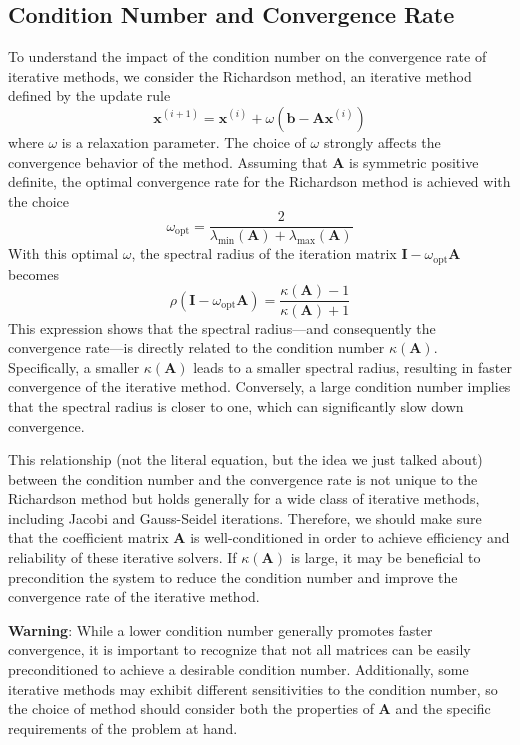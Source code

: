 \subsection{Condition Number and Convergence Rate}
To understand the impact of the condition number on the convergence rate of iterative methods, we consider the Richardson method, an iterative method defined by the update rule
\begin{equation*}
    \mathbf{x}^{(i+1)} = \mathbf{x}^{(i)} + \omega (\mathbf{b} - \mathbf{A}\mathbf{x}^{(i)})
\end{equation*}
where $\omega$ is a relaxation parameter. The choice of $\omega$ strongly affects the convergence behavior of the method. Assuming that $\mathbf{A}$ is symmetric positive definite, the optimal convergence rate for the Richardson method is achieved with the choice
\begin{equation*}
    \omega_{\text{opt}} = \frac{2}{\lambda_{\min}(\mathbf{A}) + \lambda_{\max}(\mathbf{A})}
\end{equation*}
With this optimal $\omega$, the spectral radius of the iteration matrix $\mathbf{I} - \omega_{\text{opt}} \mathbf{A}$ becomes
\begin{equation*}
    \rho(\mathbf{I} - \omega_{\text{opt}} \mathbf{A}) = \frac{\kappa(\mathbf{A}) - 1}{\kappa(\mathbf{A}) + 1}
\end{equation*}
This expression shows that the spectral radius---and consequently the convergence rate---is directly related to the condition number $\kappa(\mathbf{A})$. Specifically, a smaller $\kappa(\mathbf{A})$ leads to a smaller spectral radius, resulting in faster convergence of the iterative method. Conversely, a large condition number implies that the spectral radius is closer to one, which can significantly slow down convergence.

This relationship (not the literal equation, but the idea we just talked about) between the condition number and the convergence rate is not unique to the Richardson method but holds generally for a wide class of iterative methods, including Jacobi and Gauss-Seidel iterations. Therefore, we should make sure that the coefficient matrix $\mathbf{A}$ is well-conditioned in order to achieve efficiency and reliability of these iterative solvers. If $\kappa(\mathbf{A})$ is large, it may be beneficial to precondition the system to reduce the condition number and improve the convergence rate of the iterative method.

\begin{warningBox}
    \textbf{Warning}: While a lower condition number generally promotes faster convergence, it is important to recognize that not all matrices can be easily preconditioned to achieve a desirable condition number. Additionally, some iterative methods may exhibit different sensitivities to the condition number, so the choice of method should consider both the properties of $\mathbf{A}$ and the specific requirements of the problem at hand.
\end{warningBox}

